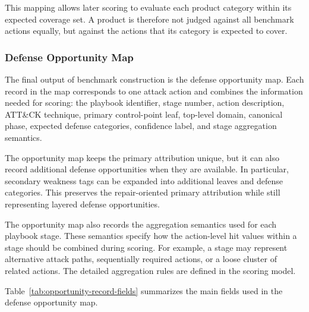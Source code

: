 This mapping allows later scoring to evaluate each product category within its expected coverage set. A product is therefore not judged against all benchmark actions equally, but against the actions that its category is expected to cover.

\subsubsection{Defense Opportunity Map}

The final output of benchmark construction is the defense opportunity map. Each record in the map corresponds to one attack action and combines the information needed for scoring: the playbook identifier, stage number, action description, ATT\&CK technique, primary control-point leaf, top-level domain, canonical phase, expected defense categories, confidence label, and stage aggregation semantics.

The opportunity map keeps the primary attribution unique, but it can also record additional defense opportunities when they are available. In particular, secondary weakness tags can be expanded into additional leaves and defense categories. This preserves the repair-oriented primary attribution while still representing layered defense opportunities.

The opportunity map also records the aggregation semantics used for each playbook stage. These semantics specify how the action-level hit values within a stage should be combined during scoring. For example, a stage may represent alternative attack paths, sequentially required actions, or a loose cluster of related actions. The detailed aggregation rules are defined in the scoring model.

Table~\ref{tab:opportunity-record-fields} summarizes the main fields used in the defense opportunity map.

